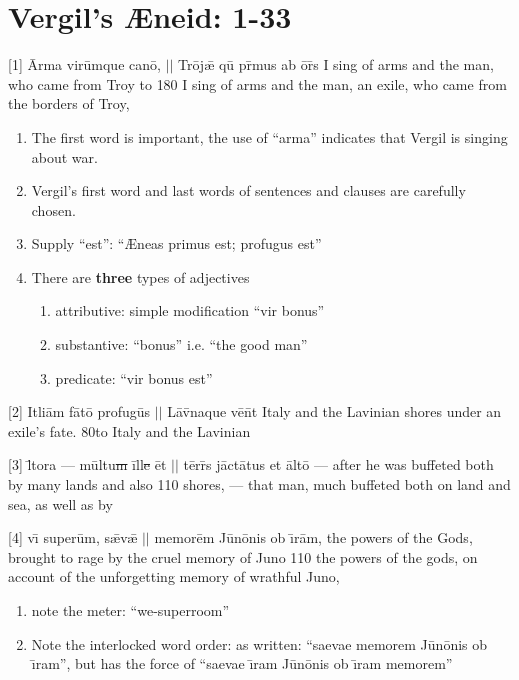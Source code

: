 \section{Vergil's {\AE}neid: 1-33} %

\latline
  {[1] \={\macron A}rm\-a v\-ir\=umqu\-e c\-an{\={\macron o}}, $||$ Tr\={o}j\={\ae} qu\={\macron{\i}} pr\={\macron{\i}}m\-us \-ab \={o}r\={\macron{\i}}s}
	{I sing of arms and the man, who came from Troy to}
  {180}
	{I sing of arms and the man, an exile, who came from the borders of Troy,}
	{
	\begin{enumerate}
			\item The first word is important, the use of ``arma'' indicates that Vergil is singing about war.
			\item Vergil's first word and last words of sentences and clauses are carefully chosen.
			\item Supply ``est'':  ``{\AE}neas primus est; profugus est''
			\item There are \textbf{three} types of adjectives
			\begin{enumerate}
				\item attributive: simple modification ``vir bonus''
				\item substantive:  ``bonus'' i.e. ``the good man''
				\item predicate:  ``vir bonus est''
			\end{enumerate}
		 \end{enumerate}	
	}

\latline
		{[2] {\macron I}tl\-i\={a}m f\={\macron a}t\={\macron o} pr\-of\-ug\={\macron u}s $||$ L\={\macron a}v\={\macron{\i}}n\-aqu\-e v\={\macron e}n\={\macron{\i}}t}
		{Italy and the Lavinian shores under an exile's fate.}
		{80}{to Italy and the Lavinian }{}


\latline
{[3] l\={\macron{\i}}t\-or\-a --- m\=ultu\sout{m }\={i}ll\={{\sout{e }}\=e}t $||$ t\=err\={\macron{\i}}s j\=act\={\macron a}t\-us \-et \=alt\={\macron o}}
{--- after he was buffeted both by many lands and also}
{110}
{shores, --- that man, much buffeted both on land and sea, as well as by}
{}


\latline
{[4] v\={\i} s\-up\-er\=um, s\={\ae}v\={\ae} $||$ m\-em\-or\=em J\={u}n\={o}n\-is \-ob \={\i}r\=am,}
{the powers of the Gods, brought to rage by the cruel memory of Juno}
{110}
{the powers of the gods, on account of the unforgetting memory of wrathful Juno,}
{
	\begin{enumerate}
		\item note the meter:  ``we-superroom''
		\item Note the interlocked word order:  as written: ``saevae memorem J\={u}n\={o}nis ob {\={\i}}ram'',
		but has the force of  ``saevae {\={\i}}ram J\={u}n\={o}nis ob \={\i}ram memorem''
	\end{enumerate}
}

